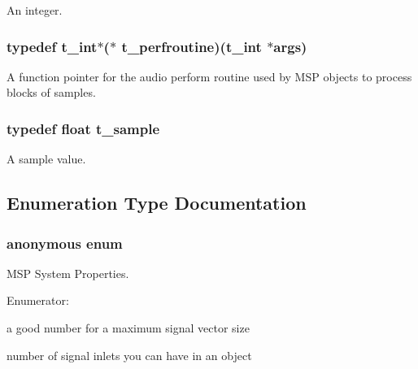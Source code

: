 An integer. \hypertarget{group__msp_gad1bc58df327774373ee9e10ad9026564}{
\subsubsection[{t\_\-perfroutine}]{\setlength{\rightskip}{0pt plus 5cm}typedef {\bf t\_\-int}$\ast$($\ast$ {\bf t\_\-perfroutine})({\bf t\_\-int} $\ast$args)}}
\label{group__msp_gad1bc58df327774373ee9e10ad9026564}


A function pointer for the audio perform routine used by MSP objects to process blocks of samples. \hypertarget{group__msp_ga8ecd36423b35083714b8740c40b57120}{
\subsubsection[{t\_\-sample}]{\setlength{\rightskip}{0pt plus 5cm}typedef float {\bf t\_\-sample}}}
\label{group__msp_ga8ecd36423b35083714b8740c40b57120}


A sample value. 

\subsection{Enumeration Type Documentation}
\hypertarget{group__msp_gadb49720dc49f7d4e4cf9adbf2948e409}{
\subsubsection[{"@20}]{\setlength{\rightskip}{0pt plus 5cm}anonymous enum}}
\label{group__msp_gadb49720dc49f7d4e4cf9adbf2948e409}


MSP System Properties. \begin{Desc}
\item[Enumerator: ]\par
\begin{description}
\item[{\em 
\hypertarget{group__msp_ggadb49720dc49f7d4e4cf9adbf2948e409a29738f7ba126b5468181b4c017e573d0}{
SYS\_\-MAXBLKSIZE}
\label{group__msp_ggadb49720dc49f7d4e4cf9adbf2948e409a29738f7ba126b5468181b4c017e573d0}
}]a good number for a maximum signal vector size \item[{\em 
\hypertarget{group__msp_ggadb49720dc49f7d4e4cf9adbf2948e409a00acca9cc1491d6006a4c38127f02a90}{
SYS\_\-MAXSIGS}
\label{group__msp_ggadb49720dc49f7d4e4cf9adbf2948e409a00acca9cc1491d6006a4c38127f02a90}
}]number of signal inlets you can have in an object \end{description}
\end{Desc}



